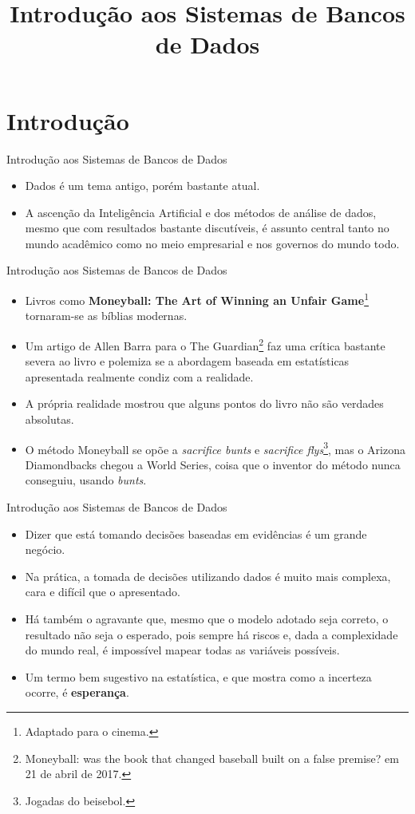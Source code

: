 \documentclass[11pt]{beamer}
\title{Introdução aos Sistemas de Bancos de Dados}
\author{}
\date{}
\begin{document}
\begin{frame}[plain]
    \titlepage
\end{frame}

\section{Introdução}

\begin{frame}{Introdução aos Sistemas de Bancos de Dados}
    \begin{itemize}
        \item Dados é um tema antigo, porém bastante atual.
        \item A ascenção da Inteligência Artificial e dos métodos de análise de dados, mesmo que com resultados bastante discutíveis, é assunto central tanto no mundo acadêmico como no meio empresarial e nos governos do mundo todo.
    \end{itemize}
\end{frame}

\begin{frame}{Introdução aos Sistemas de Bancos de Dados}
    \begin{itemize}
        \item Livros como \textbf{Moneyball: The Art of Winning an Unfair Game}\footnote{Adaptado para o cinema.} tornaram-se as bíblias modernas.
        \item Um artigo de Allen Barra para o The Guardian\footnote{Moneyball: was the book that changed baseball built on a false premise? em 21 de abril de 2017.} faz uma crítica bastante severa ao livro e polemiza se a abordagem baseada em estatísticas apresentada realmente condiz com a realidade.
        \item A própria realidade mostrou que alguns pontos do livro não são verdades absolutas.
        \item O método Moneyball se opõe a \textit{sacrifice bunts} e \textit{sacrifice flys}\footnote{Jogadas do beisebol.}, mas o Arizona Diamondbacks chegou a World Series, coisa que o inventor do método nunca conseguiu, usando \textit{bunts}.
    \end{itemize}
\end{frame}

\begin{frame}{Introdução aos Sistemas de Bancos de Dados}
    \begin{itemize}
        \item Dizer que está tomando decisões baseadas em evidências é um grande negócio.
        \item Na prática, a tomada de decisões utilizando dados é muito mais complexa, cara e difícil que o apresentado.
        \item Há também o agravante que, mesmo que o modelo adotado seja correto, o resultado não seja o esperado, pois sempre há riscos e, dada a complexidade do mundo real, é impossível mapear todas as variáveis possíveis.
        \item Um termo bem sugestivo na estatística, e que mostra como a incerteza ocorre, é \textbf{esperança}.
    \end{itemize}
\end{frame}
\end{document}
